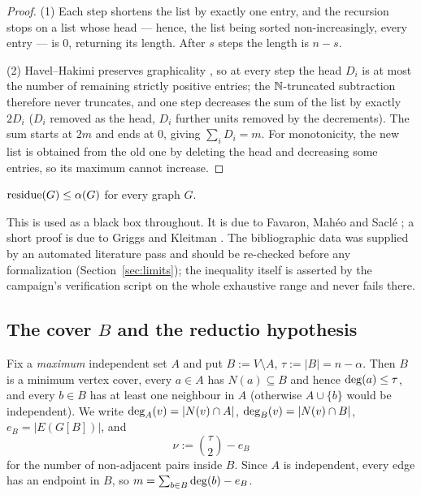 \begin{proof}
(1) Each step shortens the list by exactly one entry, and the recursion stops on a list
whose head --- hence, the list being sorted non-increasingly, every entry --- is $0$,
returning its length. After $s$ steps the length is $n - s$.

(2) Havel--Hakimi preserves graphicality \cite{havel,hakimi}, so at every step the head
$D_i$ is at most the number of remaining strictly positive entries; the $\mathbb{N}$-truncated
subtraction therefore never truncates, and one step decreases the sum of the list by
exactly $2D_i$ ($D_i$ removed as the head, $D_i$ further units removed by the decrements).
The sum starts at $2m$ and ends at $0$, giving $\sum_i D_i = m$. For monotonicity, the new
list is obtained from the old one by deleting the head and decreasing some entries, so its
maximum cannot increase.
\end{proof}

\begin{fact}\label{fact:fms}
$\operatorname{residue}(G) \le \alpha(G)$ for every graph $G$.
\end{fact}

This is used as a black box throughout. It is due to Favaron, Mah\'eo and Sacl\'e
\cite{fms}; a short proof is due to Griggs and Kleitman \cite{gk}. The bibliographic data
was supplied by an automated literature pass and should be re-checked before any
formalization (Section~\ref{sec:limits}); the inequality itself is asserted by the
campaign's verification script on the whole exhaustive range and never fails there.

\subsection{The cover \texorpdfstring{$B$}{B} and the reductio hypothesis}
\label{sec:cover}

Fix a \emph{maximum} independent set $A$ and put $B := V \setminus A$, $\tau := |B| = n -
\alpha$. Then $B$ is a minimum vertex cover, every $a \in A$ has $N(a) \subseteq B$ and
hence $\mathrm{deg}(a) \le \tau$, and every $b \in B$ has at least one neighbour in $A$ (otherwise
$A \cup \{b\}$ would be independent). We write $\mathrm{deg}_A(v) = |N(v) \cap A|$,
$\mathrm{deg}_B(v) = |N(v) \cap B|$, $e_B = |E(G[B])|$, and
\[
\nu := \binom{\tau}{2} - e_B
\]
for the number of non-adjacent pairs inside $B$. Since $A$ is independent, every edge has
an endpoint in $B$, so $m = \sum_{b \in B} \mathrm{deg}(b) - e_B$.

